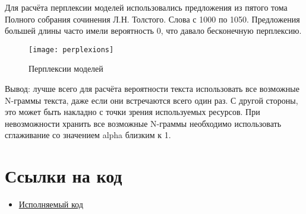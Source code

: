 \documentclass[a4paper,12pt]{article}
\begin{document}
Для расчёта перплексии моделей использовались предложения из пятого тома Полного собрания сочинения Л.Н. Толстого. Слова с 1000 по 1050. Предложения большей длины часто имели вероятность 0, что давало бесконечную перплексию.
\begin{figure}[H]
\caption{Перплексии моделей}
\centering
\texttt{[image: perplexions]}
\end{figure}

Вывод: лучше всего для расчёта вероятности текста использовать все возможные N-граммы текста, даже если они встречаются всего один раз. С другой стороны, это может быть накладно с точки зрения используемых ресурсов. При невозможности хранить все возможные N-граммы необходимо использовать сглаживание со значением alpha близким к 1.


\section{Ссылки на код}
\begin{itemize}
\item \href{https://github.com/EgorDudyrev/hse_comp_ling/blob/master/notebooks/hw2/Looking_at_the_ngrams.ipynb}{Исполняемый код}
\end{itemize}
\end{document}
